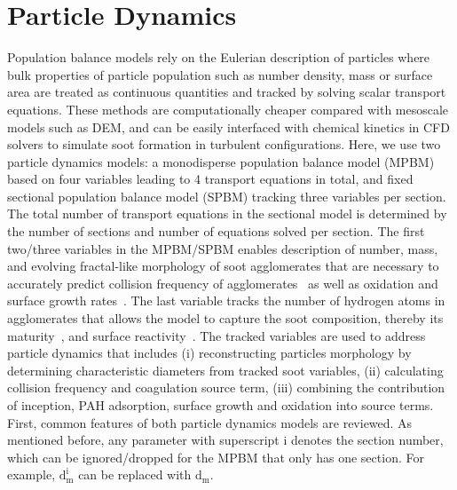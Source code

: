 \section{Particle Dynamics}
Population balance models rely on the Eulerian description of particles where bulk properties of particle population such as number density, mass or surface area are treated as continuous quantities and tracked by solving scalar transport equations. These methods are computationally cheaper compared with mesoscale models such as DEM, and can be easily interfaced with chemical kinetics in CFD solvers to simulate soot formation in turbulent configurations. Here, we use two particle dynamics models: a monodisperse population balance model (MPBM) based on four variables leading to 4 transport equations in total, and fixed sectional population balance model (SPBM) tracking three variables per section. The total number of transport equations in the sectional model is determined by the number of sections and number of equations solved per section. The first two/three variables in the MPBM/SPBM enables description of number, mass, and evolving fractal-like morphology of soot agglomerates that are necessary to accurately predict collision frequency of agglomerates~\citep{mulholland1988cluster} as well as oxidation and surface growth rates~\citep{kelesidis2019estimating}. The last variable tracks the number of hydrogen atoms in agglomerates that allows the model to capture the soot composition, thereby its maturity~\citep{kholghy2016core}, and surface reactivity~\citep{blanquart2009analyzing}.  
The tracked variables are used to address particle dynamics that includes (i) reconstructing particles morphology by determining characteristic diameters from tracked soot variables, (ii) calculating collision frequency and coagulation source term, (iii) combining the contribution of inception, PAH adsorption, surface growth and oxidation into source terms.
First, common features of both particle dynamics models are reviewed. As mentioned before, any parameter with superscript i denotes the section number, which can be ignored/dropped for the MPBM that only has one section. For example, $\mathrm{d^i_m}$ can be replaced with $\mathrm{d_m}$.

